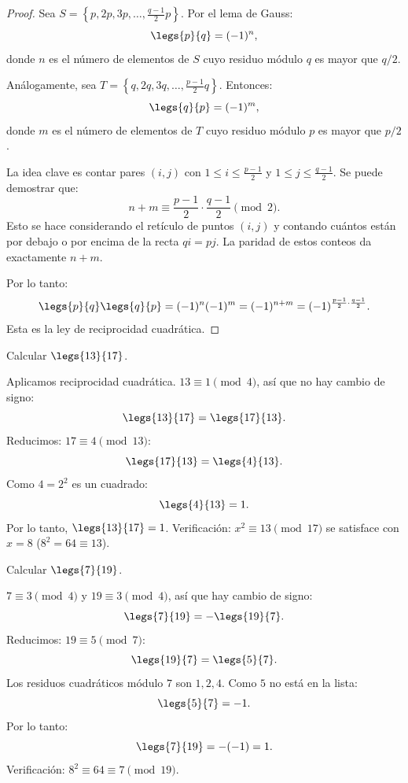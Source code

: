 \begin{proof}
Sea $S = \left\{ p, 2p, 3p, \ldots, \frac{q-1}{2}p \right\}$. Por el lema de Gauss:
\[
\legs{p}{q} = (-1)^n,
\]
donde $n$ es el número de elementos de $S$ cuyo residuo módulo $q$ es mayor que $q/2$.

Análogamente, sea $T = \left\{ q, 2q, 3q, \ldots, \frac{p-1}{2}q \right\}$. Entonces:
\[
\legs{q}{p} = (-1)^m,
\]
donde $m$ es el número de elementos de $T$ cuyo residuo módulo $p$ es mayor que $p/2$.

La idea clave es contar pares $(i,j)$ con $1 \leq i \leq \frac{p-1}{2}$ y $1 \leq j \leq \frac{q-1}{2}$. Se puede demostrar que:
\[
n + m \equiv \frac{p-1}{2} \cdot \frac{q-1}{2} \pmod{2}.
\]
Esto se hace considerando el retículo de puntos $(i,j)$ y contando cuántos están por debajo o por encima de la recta $qi = pj$. La paridad de estos conteos da exactamente $n+m$.

Por lo tanto:
\[
\legs{p}{q} \legs{q}{p} = (-1)^n (-1)^m = (-1)^{n+m} = (-1)^{\frac{p-1}{2} \cdot \frac{q-1}{2}}.
\]
Esta es la ley de reciprocidad cuadrática.
\end{proof}

\begin{ejemplo}
Calcular $\legs{13}{17}$.
\end{ejemplo}
\begin{solucion}
Aplicamos reciprocidad cuadrática. $13 \equiv 1 \pmod{4}$, así que no hay cambio de signo:
\[
\legs{13}{17} = \legs{17}{13}.
\]
Reducimos: $17 \equiv 4 \pmod{13}$:
\[
\legs{17}{13} = \legs{4}{13}.
\]
Como $4 = 2^2$ es un cuadrado:
\[
\legs{4}{13} = 1.
\]
Por lo tanto, $\legs{13}{17} = 1$.
Verificación: $x^2\equiv13\pmod{17}$ se satisface con $x=8$ ($8^2=64\equiv13$).
\end{solucion}

\begin{ejemplo}
Calcular $\legs{7}{19}$.
\end{ejemplo}
\begin{solucion}
$7 \equiv 3 \pmod{4}$ y $19 \equiv 3 \pmod{4}$, así que hay cambio de signo:
\[
\legs{7}{19} = -\legs{19}{7}.
\]
Reducimos: $19 \equiv 5 \pmod{7}$:
\[
\legs{19}{7} = \legs{5}{7}.
\]
Los residuos cuadráticos módulo $7$ son $1, 2, 4$. Como $5$ no está en la lista:
\[
\legs{5}{7} = -1.
\]
Por lo tanto:
\[
\legs{7}{19} = -(-1) = 1.
\]
Verificación: $8^2 \equiv 64 \equiv 7 \pmod{19}$.
\end{solucion}


